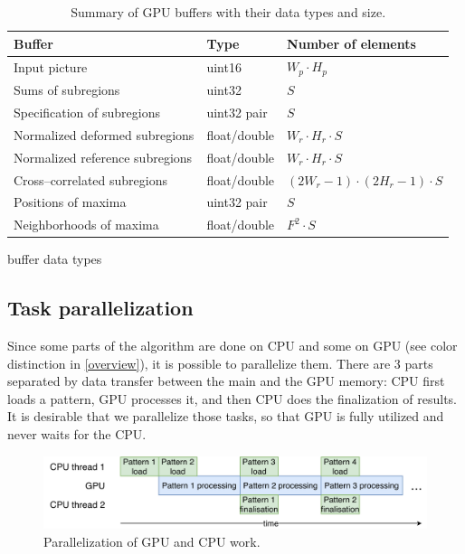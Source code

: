 \begin{table}[]
	\begin{tabular}{@{}lll@{}}
		\toprule
		Buffer                          & Type         & Number of elements             \\ \midrule
		Input picture                   & uint16       & $W_p \cdot H_p$                \\
		Sums of subregions              & uint32       & $S$                            \\
		Specification of subregions     & uint32 pair  & $S$                            \\
		Normalized deformed subregions  & float/double & $W_r \cdot H_r \cdot S$        \\
		Normalized reference subregions & float/double & $W_r \cdot H_r \cdot S$        \\
		Cross--correlated subregions    & float/double & $(2W_r-1)\cdot(2H_r-1)\cdot S$ \\
		Positions of maxima             & uint32 pair  & $S$                            \\
		Neighborhoods of maxima         & float/double & $F^2 \cdot S $                 \\ \bottomrule
	\end{tabular}
	\caption{Summary of GPU buffers with their data types and size.}
	\label{buftypes}
\end{table}

buffer data types

\subsection{Task parallelization}

Since some parts of the algorithm are done on CPU and some on GPU (see color distinction in \cref{overview}), it is possible to parallelize them. There are 3 parts separated by data transfer between the main and the GPU memory: CPU first loads a pattern, GPU processes it, and then CPU does the finalization of results. It is desirable that we parallelize those tasks, so that GPU is fully utilized and never waits for the CPU.

\begin{figure}
	\centering
	\includegraphics[width=\textwidth]{img/CPUGPUparal}
	\caption{Parallelization of GPU and CPU work.}
	\label{pipeline}
\end{figure}

